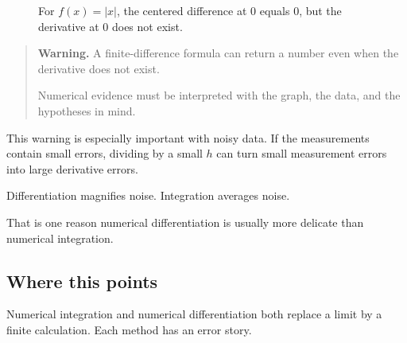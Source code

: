 \begin{figure}[h]
\centering
{}
\caption{For \(f(x)=|x|\), the centered difference at \(0\) equals \(0\), but the derivative at \(0\) does not exist.}
\label{fig:centered-difference-absolute-value}
\end{figure}

\begin{quote}
\textbf{Warning.}
A finite-difference formula can return a number even when the derivative does not
exist.

Numerical evidence must be interpreted with the graph, the data, and the hypotheses
in mind.
\end{quote}

This warning is especially important with noisy data.  If the measurements contain
small errors, dividing by a small \(h\) can turn small measurement errors into large
derivative errors.

Differentiation magnifies noise.  Integration averages noise.

That is one reason numerical differentiation is usually more delicate than numerical
integration.

\subsection{Where this points}
\label{subsec:numerical-differentiation-hook-newton-revisited}

Numerical integration and numerical differentiation both replace a limit by a finite
calculation.  Each method has an error story.

